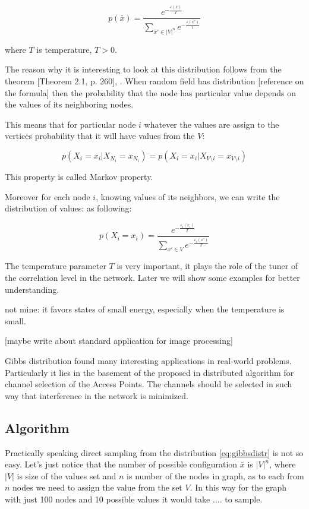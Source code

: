 \documentclass[12pt]{report}
\begin{document}
\begin{equation} \label{eq:gibbsdistr}
p(\bar{x}) = \frac{ e^{-\frac{ \varepsilon (\bar{x})}{T}} }{ \sum\limits_{\bar{x}'\in |V|^n} e^{-\frac{\varepsilon(\bar{x}')}{T}}} 
\end{equation}

where $T$ is temperature, $T > 0$.


The reason why it is interesting to look at this distribution follows from the theorem [Theorem 2.1, p. 260], \cite{bremaud2013markov}. When random field has distribution [reference on the formula] then the probability that the node has particular value depends on the values of its neighboring nodes.

This means that for particular node $i$ whatever the values are assign to the vertices  probability that it will have values from the $V$:

$$ p(X_i = x_i | X_{N_i} = x_{N_i}) = p(X_i = x_i | X_{V \setminus i} = x_{V\setminus i}) $$

This property is called Markov property.

Moreover for each node $i$, knowing values of its neighbors, we can write the distribution of values: as following:

$$ p(X_i = x_i) = \frac{ e^{-\frac{\varepsilon_i(x_i)}{T}} }{ \sum\limits_{x'\in V} e^{-\frac{\varepsilon_i(x')}{T}}} $$

The temperature parameter $T$ is very important, it plays the role of the tuner of the correlation level in the network. Later we will show some examples for better understanding. 

not mine: it favors states of small energy, especially when the temperature is small.

[maybe write about standard application for image processing]

Gibbs distribution found many interesting applications in real-world problems. Particularly it lies in the basement of the proposed in \cite{kauffmann2007measurement} distributed algorithm for channel selection of the Access Points. The channels should be selected in such way that interference in the network is minimized. 

\subsection{Algorithm} 

Practically speaking direct sampling from the distribution \ref{eq:gibbsdistr} is not so easy. Let's just notice that the number of possible configuration $\bar{x}$ is $|V|^n$, where $|V|$ is size of the values set and $n$ is number of the nodes in graph, as to each from $n$ nodes we need to assign the value from the set $V$. 
In this way for the graph with just 100 nodes and 10 possible values it would take .... to sample.  
\end{document}
